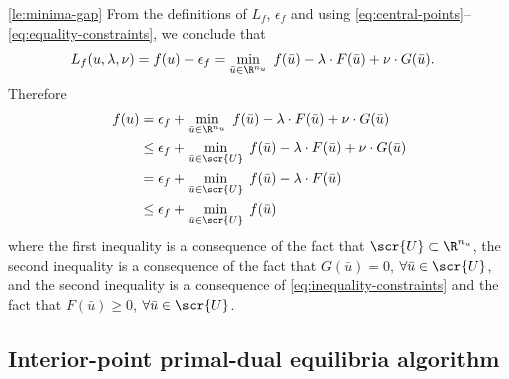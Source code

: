 \documentclass[11pt]{article}
\begin{document}
\begin{proof-lemma}{\ref{le:minima-gap}}
  From the definitions of $L_f$, $\epsilon_f$ and using
  \eqref{eq:central-points}--\eqref{eq:equality-constraints}, we
  conclude that
  \begin{align*}
    L_f(u,\lambda,\nu) =f(u)-\epsilon_f& =\min_{\bar u\in\R^{n_u}}\; f(\bar u)-\lambda\cdot F(\bar u)+\nu\cdot  G(\bar u).
  \end{align*}
  Therefore
  \begin{align*}
    f(u)
    &=\epsilon_f+\min_{\bar u\in\R^{n_u}}\; f(\bar u)-\lambda\cdot F(\bar u)+\nu\cdot G(\bar u)\\
    &\le\epsilon_f+\min_{\bar u\in\scr{U}}\; f(\bar u)-\lambda\cdot F(\bar u)+\nu\cdot G(\bar u)\\
    &= \epsilon_f+\min_{\bar u\in\scr{U}}\; f(\bar u)-\lambda\cdot F(\bar u)\\
    &\le \epsilon_f+\min_{\bar u\in\scr{U}}\; f(\bar u)
  \end{align*}
  where the first inequality is a consequence of the fact that
  $\scr{U}\subset \R^{n_u}$, the second inequality is a consequence of the
  fact that $G(\bar u)=0$, $\forall \bar u\in\scr{U}$, and the second
  inequality is a consequence of \eqref{eq:inequality-constraints} and
  the fact that $F(\bar u)\ge0$, $\forall \bar u\in\scr{U}$. \frQED
\end{proof-lemma}

\subsection{Interior-point primal-dual equilibria algorithm}
\end{document}
